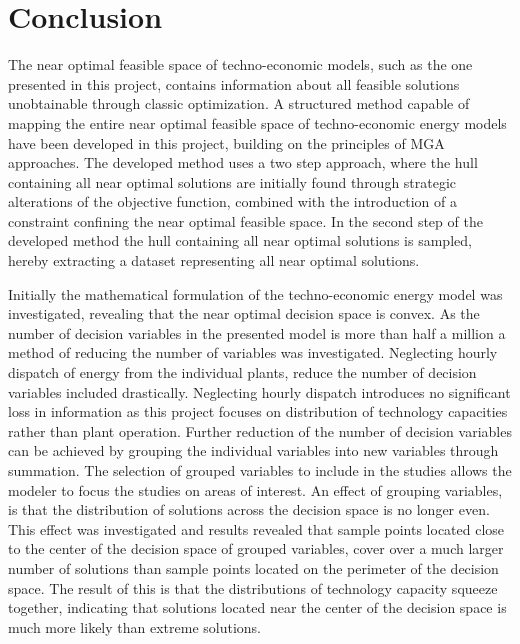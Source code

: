 
\chapter{Conclusion}


The near optimal feasible space of techno-economic models, such as the one presented in this project, contains information about all feasible solutions unobtainable through classic optimization. A structured method capable of mapping the entire near optimal feasible space of techno-economic energy models have been developed in this project, building on the principles of MGA approaches. The developed method uses a two step approach, where the hull containing all near optimal solutions are initially found through strategic alterations of the objective function, combined with the introduction of a constraint confining the near optimal feasible space. In the second step of the developed method the hull containing all near optimal solutions is sampled, hereby extracting a dataset representing all near optimal solutions. 


Initially the mathematical formulation of the techno-economic energy model was investigated, revealing that the near optimal decision space is convex. As the number of decision variables in the presented model is more than half a million a method of reducing the number of variables was investigated. Neglecting hourly dispatch of energy from the individual plants, reduce the number of decision variables included drastically. Neglecting hourly dispatch introduces no significant loss in information as this project focuses on distribution of technology capacities rather than plant operation. Further reduction of the number of decision variables can be achieved by grouping the individual variables into new variables through summation. The selection of grouped variables to include in the studies allows the modeler to focus the studies on areas of interest. An effect of grouping variables, is that the distribution of solutions across the decision space is no longer even. This effect was investigated and results revealed that sample points located close to the center of the decision space of grouped variables, cover over a much larger number of solutions than sample points located on the perimeter of the decision space. The result of this is that the distributions of technology capacity squeeze together, indicating that solutions located near the center of the decision space is much more likely than extreme solutions.

